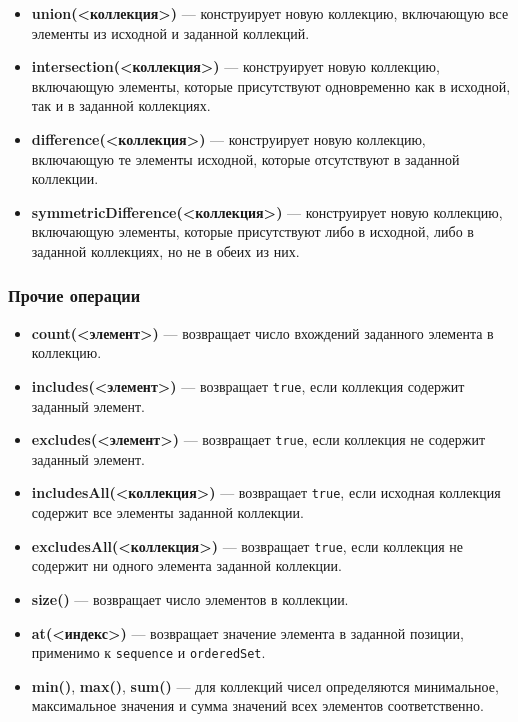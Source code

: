 \documentclass[a4paper,12pt]{article}
\begin{document}
\begin{itemize}
    \item \textbf{union(<коллекция>)} — конструирует новую коллекцию, включающую все элементы из исходной и заданной коллекций.
    \item \textbf{intersection(<коллекция>)} — конструирует новую коллекцию, включающую элементы, которые присутствуют одновременно как в исходной, так и в заданной коллекциях.
    \item \textbf{difference(<коллекция>)} — конструирует новую коллекцию, включающую те элементы исходной, которые отсутствуют в заданной коллекции.
    \item \textbf{symmetricDifference(<коллекция>)} — конструирует новую коллекцию, включающую элементы, которые присутствуют либо в исходной, либо в заданной коллекциях, но не в обеих из них.
\end{itemize}

\subsubsection{Прочие операции}

\begin{itemize}
    \item \textbf{count(<элемент>)} — возвращает число вхождений заданного элемента в коллекцию.
    \item \textbf{includes(<элемент>)} — возвращает \texttt{true}, если коллекция содержит заданный элемент.
    \item \textbf{excludes(<элемент>)} — возвращает \texttt{true}, если коллекция не содержит заданный элемент.
    \item \textbf{includesAll(<коллекция>)} — возвращает \texttt{true}, если исходная коллекция содержит все элементы заданной коллекции.
    \item \textbf{excludesAll(<коллекция>)} — возвращает \texttt{true}, если коллекция не содержит ни одного элемента заданной коллекции.
    \item \textbf{size()} — возвращает число элементов в коллекции.
    \item \textbf{at(<индекс>)} — возвращает значение элемента в заданной позиции, применимо к \texttt{sequence} и \texttt{orderedSet}.
    \item \textbf{min()}, \textbf{max()}, \textbf{sum()} — для коллекций чисел определяются минимальное, максимальное значения и сумма значений всех элементов соответственно.
\end{itemize}
\end{document}
